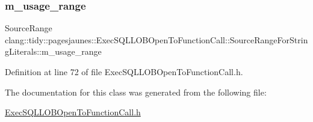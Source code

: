 \subsubsection{\texorpdfstring{m\+\_\+usage\+\_\+range}{m\_usage\_range}}
{\footnotesize\ttfamily Source\+Range clang\+::tidy\+::pagesjaunes\+::\+Exec\+S\+Q\+L\+L\+O\+B\+Open\+To\+Function\+Call\+::\+Source\+Range\+For\+String\+Literals\+::m\+\_\+usage\+\_\+range}



Definition at line 72 of file Exec\+S\+Q\+L\+L\+O\+B\+Open\+To\+Function\+Call.\+h.



The documentation for this class was generated from the following file\+:\begin{DoxyCompactItemize}
\item 
\hyperlink{_exec_s_q_l_l_o_b_open_to_function_call_8h}{Exec\+S\+Q\+L\+L\+O\+B\+Open\+To\+Function\+Call.\+h}\end{DoxyCompactItemize}
